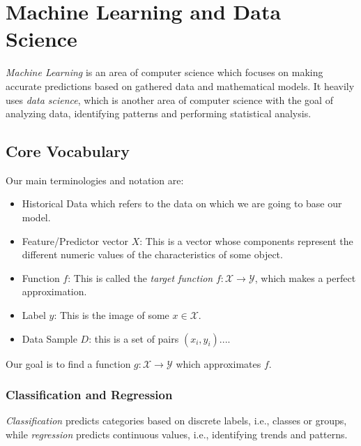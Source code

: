 \chapter{Machine Learning and Data Science}

\emph{Machine Learning} is an area of computer science which focuses on making accurate
predictions based on gathered data and mathematical models. It heavily uses \emph{data science}, which is another
area of computer science with the goal of analyzing data, identifying patterns and performing statistical analysis.

\section{Core Vocabulary}

Our main terminologies and notation are:

\begin{itemize}

	\item Historical Data which refers to the data on which we are going to base our model.

	\item Feature/Predictor vector \(X\): This is a vector whose components represent the different numeric values of the characteristics
	of some object.

	\item Function \(f\): This is called the \emph{target function} \(f: \mathcal{X} \to \mathcal{Y}\), which makes a perfect approximation.

	\item Label \(y\): This is the image of some \(x \in \mathcal{X}\).

	\item Data Sample \(D\): this is a set of pairs \((x_i, y_i)\)....

\end{itemize}

Our goal is to find a function \(g: \mathcal{X} \to \mathcal{Y}\) which approximates \(f\).

\subsection{Classification and Regression}

\emph{Classification} predicts categories based on discrete labels, i.e., classes or groups, while \emph{regression} predicts
continuous values, i.e., identifying trends and patterns.

